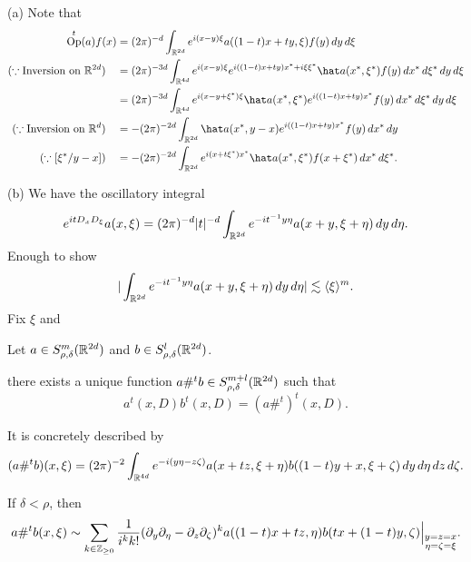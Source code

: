 \documentclass{../../large}
\DeclareMathOperator{\Op}{Op}
\begin{document}
\begin{pf}
(a)
Note that
\begin{align*}
\Op^t(a)f(x)
&=(2\pi)^{-d}\int_{\R^{2d}}e^{i(x-y)\xi}a((1-t)x+ty,\xi)f(y)\,dy\,d\xi\\
(\because\text{Inversion on }\R^{2d})\quad
&=(2\pi)^{-3d}\int_{\R^{4d}}e^{i(x-y)\xi}e^{i((1-t)x+ty)x^*+i\xi\xi^*}\hat a(x^*,\xi^*)f(y)\,dx^*\,d\xi^*\,dy\,d\xi\\
&=(2\pi)^{-3d}\int_{\R^{4d}}e^{i(x-y+\xi^*)\xi}\hat a(x^*,\xi^*)e^{i((1-t)x+ty)x^*}f(y)\,dx^*\,d\xi^*\,dy\,d\xi\\
(\because\text{Inversion on }\R^d)\quad
&=-(2\pi)^{-2d}\int_{\R^{2d}}\hat a(x^*,y-x)e^{i((1-t)x+ty)x^*}f(y)\,dx^*\,dy\\
(\because[\xi^*/y-x])\quad
&=-(2\pi)^{-2d}\int_{\R^{2d}}e^{i(x+t\xi^*)x^*}\hat a(x^*,\xi^*)f(x+\xi^*)\,dx^*\,d\xi^*.
\end{align*}

(b)
We have the oscillatory integral
\[e^{itD_xD_\xi}a(x,\xi)=(2\pi)^{-d}|t|^{-d}\int_{\mathbb{R}^{2d}}e^{-it^{-1}y\eta}a(x+y,\xi+\eta)\,dy\,d\eta.\]
Enough to show
\[|\int_{\mathbb{R}^{2d}}e^{-it^{-1}y\eta}a(x+y,\xi+\eta)\,dy\,d\eta|\lesssim\langle\xi\rangle^m.\]
Fix $\xi$ and
\delta\le\rho
\end{pf}




\begin{prb}
Let $a\in S_{\rho,\delta}^m(\mathbb{R}^{2d})$ and $b\in S_{\rho,\delta}^l(\mathbb{R}^{2d})$.
\begin{parts}
\item there exists a unique function $a\#^tb\in S_{\rho,\delta}^{m+l}(\mathbb{R}^{2d})$ such that
\[a^t(x,D)b^t(x,D)=(a\#^t)^t(x,D).\]
\item It is concretely described by
\[(a\#^tb)(x,\xi)=(2\pi)^{-2}\int_{\mathbb{R}^{4d}}e^{-i(y\eta-z\zeta)}a(x+tz,\xi+\eta)b((1-t)y+x,\xi+\zeta)\,dy\,d\eta\,dz\,d\zeta.\]
\item If $\delta<\rho$, then
\[a\#^tb(x,\xi)\sim\sum_{k\in\mathbb{Z}_{\ge0}}\frac1{i^kk!}(\partial_y\partial_\eta-\partial_z\partial_\zeta)^ka((1-t)x+tz,\eta)b(tx+(1-t)y,\zeta)\Bigr|_{\substack{y=z=x\\\eta=\zeta=\xi}}.\]
\end{parts}
\end{prb}



\begin{prb}
\end{prb}
\end{document}
